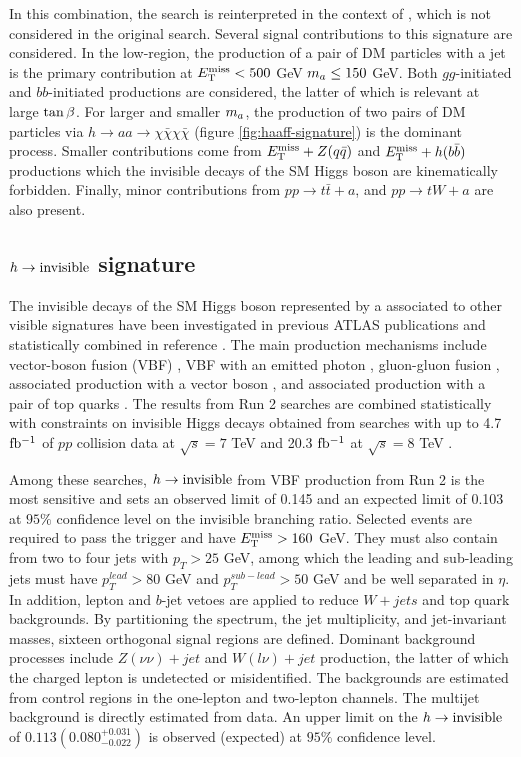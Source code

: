 In this combination, the search is reinterpreted in the context of \hdma, which is not considered in the original search. Several signal contributions to this signature are considered. In the low-\met region, the production of a pair of DM particles with a jet is the primary contribution at $E_{\mathrm{T}}^{\mathrm{miss}}< 500$ GeV $m_a\le 150$ GeV. Both $gg$-initiated and $bb$-initiated productions are considered, the latter of which is relevant at large $\tan\beta$. For larger \met and smaller $m_a$, the production of two pairs of DM particles via $h\rightarrow aa \rightarrow \chi\bar{\chi}\chi\bar{\chi}$ (figure \ref{fig:haaff-signature}) is the dominant process. Smaller contributions come from $E_{\mathrm{T}}^{\mathrm{miss}}+Z(q\bar{q})$ and $E_{\mathrm{T}}^{\mathrm{miss}} + h(b\bar{b})$ productions which the invisible decays of the SM Higgs boson are kinematically forbidden. Finally, minor contributions from $pp\rightarrow t\bar{t} +a$, and $pp\rightarrow tW+a$ are also present.

\subsection{\texorpdfstring{$h\rightarrow \mathrm{invisible}$}{TEXT} signature}

The invisible decays of the SM Higgs boson represented by a \met associated to other visible signatures have been investigated in previous ATLAS publications and statistically combined in reference \cite{HIGG-2021-05}. The main production mechanisms include vector-boson fusion (VBF) \cite{EXOT-2020-11}, VBF with an emitted photon \cite{EXOT-2021-17}, gluon-gluon fusion \cite{EXOT-2018-06}, associated production with a vector boson \cite{HIGG-2018-26}, and associated production with a pair of top quarks \cite{SUSY-2019-12}. The results from Run 2 searches are combined statistically with constraints on invisible Higgs decays obtained from searches with up to 4.7 $\mbox{fb\(^{-1}\)}$ of $pp$ collision data at $\sqrt{s}=7$ TeV and 20.3 $\mbox{fb\(^{-1}\)}$ at $\sqrt{s}=8$ TeV \cite{HIGG-2015-03}. 

Among these searches, $h\rightarrow \mathrm{invisible}$ from VBF production from Run 2 is the most sensitive and sets an observed limit of 0.145 and an expected limit of 0.103 at $95\%$ confidence level on the invisible branching ratio. Selected events are required to pass the \met trigger and have $E_{\mathrm{T}}^{\mathrm{miss}}>160$ GeV. They must also contain from two to four jets with $p_T>25$ GeV, among which the leading and sub-leading jets must have $p_T^{lead}>80$ GeV and $p_T^{sub-lead}>50$ GeV and be well separated in $\eta$. In addition, lepton and $b$-jet vetoes are applied to reduce $W+jets$ and top quark backgrounds. By partitioning the \met spectrum, the jet multiplicity, and jet-invariant masses, sixteen orthogonal signal regions are defined. Dominant background processes include $Z(\nu\nu)+jet$ and $W(l\nu)+jet$ production, the latter of which the charged lepton is undetected or misidentified. The backgrounds are estimated from control regions in the one-lepton and two-lepton channels. The multijet background is directly estimated from data. An upper limit on the $h\rightarrow \mathrm{invisible}$ of $0.113\left(0.080^{+0.031}_{-0.022} \right)$ is observed (expected) at $95\%$ confidence level. 

